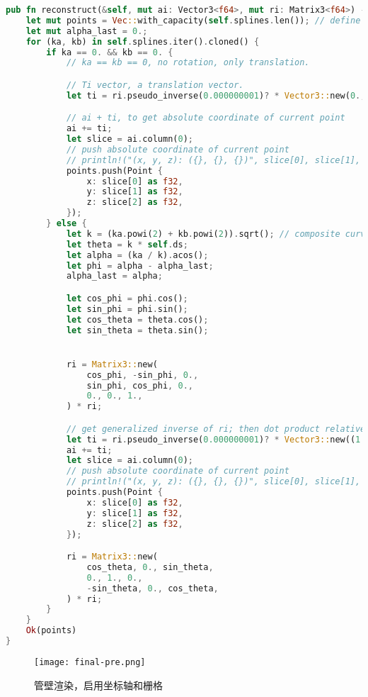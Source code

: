 \cleardoublepage
{}

\begin{lstlisting}[language=Rust, style=boxed]
pub fn reconstruct(&self, mut ai: Vector3<f64>, mut ri: Matrix3<f64>) -> Result<Vec<Point>, &'static str> {
    let mut points = Vec::with_capacity(self.splines.len()); // define points vector and reserve capacity
    let mut alpha_last = 0.;
    for (ka, kb) in self.splines.iter().cloned() {
        if ka == 0. && kb == 0. {
            // ka == kb == 0, no rotation, only translation.

            // Ti vector, a translation vector.
            let ti = ri.pseudo_inverse(0.000000001)? * Vector3::new(0., 0., self.ds);

            // ai + ti, to get absolute coordinate of current point
            ai += ti;
            let slice = ai.column(0);
            // push absolute coordinate of current point
            // println!("(x, y, z): ({}, {}, {})", slice[0], slice[1], slice[2]);
            points.push(Point {
                x: slice[0] as f32,
                y: slice[1] as f32,
                z: slice[2] as f32,
            });
        } else {
            let k = (ka.powi(2) + kb.powi(2)).sqrt(); // composite curvature
            let theta = k * self.ds;
            let alpha = (ka / k).acos();
            let phi = alpha - alpha_last;
            alpha_last = alpha;

            let cos_phi = phi.cos();
            let sin_phi = phi.sin();
            let cos_theta = theta.cos();
            let sin_theta = theta.sin();


            ri = Matrix3::new(
                cos_phi, -sin_phi, 0.,
                sin_phi, cos_phi, 0.,
                0., 0., 1.,
            ) * ri;

            // get generalized inverse of ri; then dot product relative coordinate
            let ti = ri.pseudo_inverse(0.000000001)? * Vector3::new((1. - cos_theta) / k, 0., sin_theta / k);
            ai += ti;
            let slice = ai.column(0);
            // push absolute coordinate of current point
            // println!("(x, y, z): ({}, {}, {})", slice[0], slice[1], slice[2]);
            points.push(Point {
                x: slice[0] as f32,
                y: slice[1] as f32,
                z: slice[2] as f32,
            });

            ri = Matrix3::new(
                cos_theta, 0., sin_theta,
                0., 1., 0.,
                -sin_theta, 0., cos_theta,
            ) * ri;
        }
    }
    Ok(points)
}
\end{lstlisting}


\begin{figure}
\centering
\texttt{[image: final-pre.png]}
\caption{管壁渲染，启用坐标轴和栅格}
\label{fig:final-pre}
\end{figure}